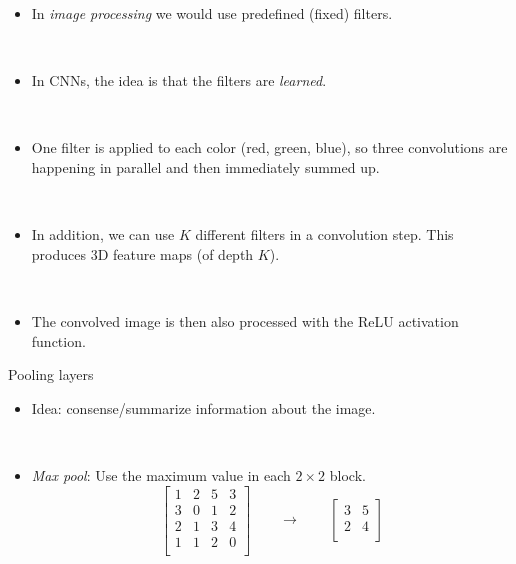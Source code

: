 \documentclass[
  10pt,
  ignorenonframetext,
  twocolumn]{beamer}
\providecommand{\tightlist}{%
  \setlength{\itemsep}{0pt}\setlength{\parskip}{0pt}}
\begin{document}
\begin{frame}
\begin{itemize}
\tightlist
\item
  In \emph{image processing} we would use predefined (fixed) filters.
\end{itemize}

\(~\)

\begin{itemize}
\tightlist
\item
  In CNNs, the idea is that the filters are \emph{learned}.
\end{itemize}

\(~\)

\begin{itemize}
\tightlist
\item
  One filter is applied to each color (red, green, blue), so three
  convolutions are happening in parallel and then immediately summed up.
\end{itemize}

\(~\)

\begin{itemize}
\tightlist
\item
  In addition, we can use \(K\) different filters in a convolution step.
  This produces 3D feature maps (of depth \(K\)).
\end{itemize}

\(~\)

\begin{itemize}
\tightlist
\item
  The convolved image is then also processed with the ReLU activation
  function.
\end{itemize}
\end{frame}

\begin{frame}
\begin{block}{Pooling layers}
\label{pooling-layers}
\(~\)

\begin{itemize}
\tightlist
\item
  Idea: consense/summarize information about the image.
\end{itemize}

\(~\)

\begin{itemize}
\tightlist
\item
  \emph{Max pool}: Use the maximum value in each \(2\times 2\) block.
  \[\left[ 
  \begin{matrix}
  1 & 2 & 5 & 3 \\
  3 & 0 & 1 & 2 \\
  2 & 1 & 3 & 4\\
  1 & 1 & 2 & 0 \\
  \end{matrix}
  \right] \qquad \rightarrow \qquad 
  \left[ 
  \begin{matrix}
  3 & 5 \\
  2 & 4 \\
  \end{matrix}\right] \]
\end{itemize}
\end{block}
\end{frame}
\end{document}
